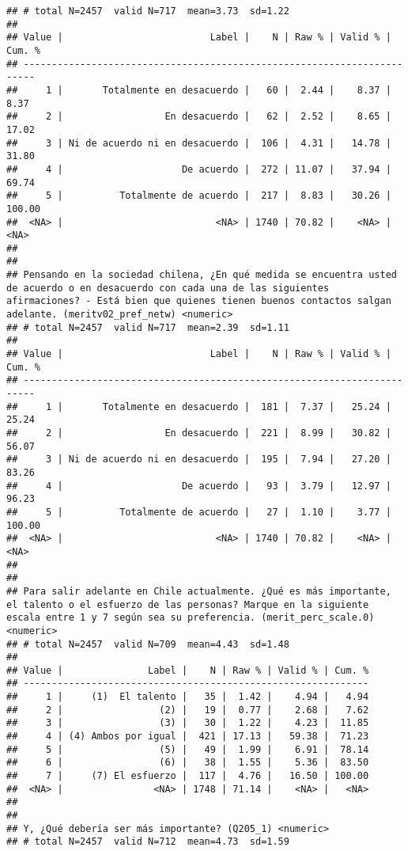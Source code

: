 \documentclass[
  10,
  landscape,
  legalpaper]{article}
\begin{document}
\begin{verbatim}
## # total N=2457  valid N=717  mean=3.73  sd=1.22
## 
## Value |                          Label |    N | Raw % | Valid % | Cum. %
## ------------------------------------------------------------------------
##     1 |       Totalmente en desacuerdo |   60 |  2.44 |    8.37 |   8.37
##     2 |                  En desacuerdo |   62 |  2.52 |    8.65 |  17.02
##     3 | Ni de acuerdo ni en desacuerdo |  106 |  4.31 |   14.78 |  31.80
##     4 |                     De acuerdo |  272 | 11.07 |   37.94 |  69.74
##     5 |          Totalmente de acuerdo |  217 |  8.83 |   30.26 | 100.00
##  <NA> |                           <NA> | 1740 | 70.82 |    <NA> |   <NA>
## 
## 
## Pensando en la sociedad chilena, ¿En qué medida se encuentra usted de acuerdo o en desacuerdo con cada una de las siguientes afirmaciones? - Está bien que quienes tienen buenos contactos salgan adelante. (meritv02_pref_netw) <numeric>
## # total N=2457  valid N=717  mean=2.39  sd=1.11
## 
## Value |                          Label |    N | Raw % | Valid % | Cum. %
## ------------------------------------------------------------------------
##     1 |       Totalmente en desacuerdo |  181 |  7.37 |   25.24 |  25.24
##     2 |                  En desacuerdo |  221 |  8.99 |   30.82 |  56.07
##     3 | Ni de acuerdo ni en desacuerdo |  195 |  7.94 |   27.20 |  83.26
##     4 |                     De acuerdo |   93 |  3.79 |   12.97 |  96.23
##     5 |          Totalmente de acuerdo |   27 |  1.10 |    3.77 | 100.00
##  <NA> |                           <NA> | 1740 | 70.82 |    <NA> |   <NA>
## 
## 
## Para salir adelante en Chile actualmente. ¿Qué es más importante, el talento o el esfuerzo de las personas? Marque en la siguiente escala entre 1 y 7 según sea su preferencia. (merit_perc_scale.0) <numeric>
## # total N=2457  valid N=709  mean=4.43  sd=1.48
## 
## Value |               Label |    N | Raw % | Valid % | Cum. %
## -------------------------------------------------------------
##     1 |     (1)  El talento |   35 |  1.42 |    4.94 |   4.94
##     2 |                 (2) |   19 |  0.77 |    2.68 |   7.62
##     3 |                 (3) |   30 |  1.22 |    4.23 |  11.85
##     4 | (4) Ambos por igual |  421 | 17.13 |   59.38 |  71.23
##     5 |                 (5) |   49 |  1.99 |    6.91 |  78.14
##     6 |                 (6) |   38 |  1.55 |    5.36 |  83.50
##     7 |     (7) El esfuerzo |  117 |  4.76 |   16.50 | 100.00
##  <NA> |                <NA> | 1748 | 71.14 |    <NA> |   <NA>
## 
## 
## Y, ¿Qué debería ser más importante? (Q205_1) <numeric>
## # total N=2457  valid N=712  mean=4.73  sd=1.59

\end{verbatim}
\end{document}

